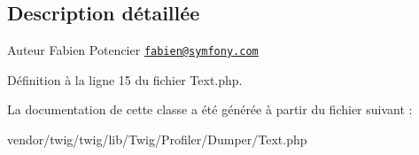 \subsection{Description détaillée}
\begin{DoxyAuthor}{Auteur}
Fabien Potencier \href{mailto:fabien@symfony.com}{\tt fabien@symfony.\+com} 
\end{DoxyAuthor}


Définition à la ligne 15 du fichier Text.\+php.



La documentation de cette classe a été générée à partir du fichier suivant \+:\begin{DoxyCompactItemize}
\item 
vendor/twig/twig/lib/\+Twig/\+Profiler/\+Dumper/Text.\+php\end{DoxyCompactItemize}
